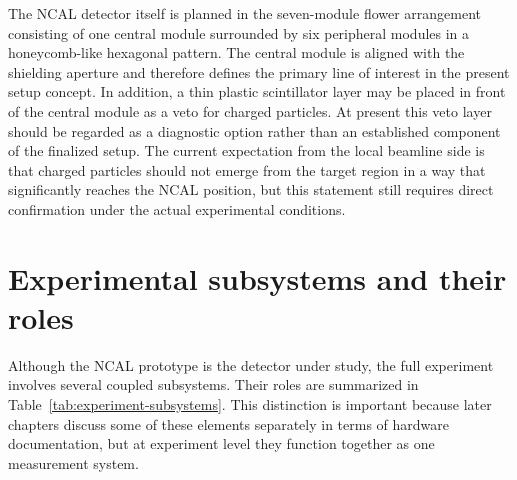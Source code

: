 The NCAL detector itself is planned in the seven-module flower arrangement consisting of one central module surrounded by six peripheral modules in a honeycomb-like hexagonal pattern. The central module is aligned with the shielding aperture and therefore defines the primary line of interest in the present setup concept. In addition, a thin plastic scintillator layer may be placed in front of the central module as a veto for charged particles. At present this veto layer should be regarded as a diagnostic option rather than an established component of the finalized setup. The current expectation from the local beamline side is that charged particles should not emerge from the target region in a way that significantly reaches the NCAL position, but this statement still requires direct confirmation under the actual experimental conditions.

\section{Experimental subsystems and their roles}

Although the NCAL prototype is the detector under study, the full experiment involves several coupled subsystems. Their roles are summarized in Table~\ref{tab:experiment-subsystems}. This distinction is important because later chapters discuss some of these elements separately in terms of hardware documentation, but at experiment level they function together as one measurement system.

